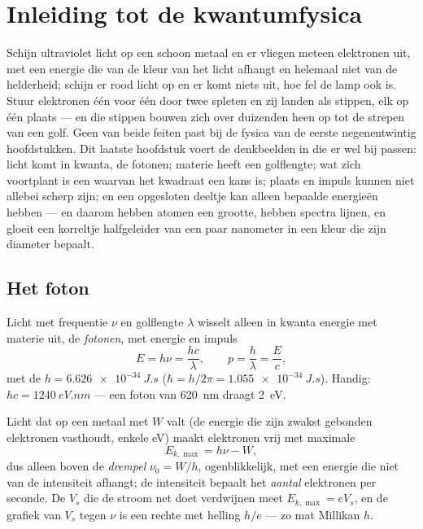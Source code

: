 \chapter{Inleiding tot de kwantumfysica}\label{ch:b1:quantum-introduction}

Schijn ultraviolet licht op een schoon metaal en er vliegen meteen elektronen
uit, met een energie die van de kleur van het licht afhangt en helemaal niet
van de helderheid; schijn er rood licht op en er komt niets uit, hoe fel
de lamp ook is. Stuur elektronen één voor één door twee spleten en zij
landen als stippen, elk op één plaats --- en die stippen bouwen zich over
duizenden heen op tot de strepen van een golf. Geen van beide feiten past bij de
fysica van de eerste negenentwintig hoofdstukken. Dit laatste hoofdstuk voert de
denkbeelden in die er wel bij passen: licht komt in kwanta, de fotonen; materie
heeft een golflengte; wat zich voortplant is een  waarvan het kwadraat
een kans is; plaats en impuls kunnen niet allebei scherp zijn; en een
opgesloten deeltje kan alleen bepaalde energieën hebben --- en daarom hebben
atomen een grootte, hebben spectra lijnen, en gloeit een korreltje halfgeleider
van een paar nanometer in een kleur die zijn diameter bepaalt.

\section{Het foton}

\begin{theorem}\label{thm:b1:quantum-introduction:photon}
Licht met frequentie $\nu$ en golflengte $\lambda$ wisselt alleen in kwanta
energie met materie uit, de \emph{fotonen}, met energie en impuls
\[
E = h\nu = \frac{hc}{\lambda} , \qquad p = \frac{h}{\lambda} = \frac{E}{c} ,
\]
met de \emph{} $h = \qty{6.626e-34}{J.s}$ ($\hbar = h/2\pi =
\qty{1.055e-34}{J.s}$). Handig: $hc = \qty{1240}{eV.nm}$ --- een foton van
\qty{620}{nm} draagt \qty{2}{eV}.
\end{theorem}
\admitted

\begin{proposition}\label{prop:b1:quantum-introduction:photoelectric}
Licht dat op een metaal met \emph{} $W$ valt (de energie die
zijn zwakst gebonden elektronen vasthoudt, enkele eV) maakt elektronen vrij met
maximale 
\[
E_{k,\max} = h\nu - W ,
\]
dus alleen boven de \emph{drempel} $\nu_0 = W/h$, ogenblikkelijk, met een
energie die niet van de intensiteit afhangt; de intensiteit bepaalt het
\emph{aantal} elektronen per seconde. De \emph{}
$V_s$ die de stroom net doet verdwijnen meet $E_{k,\max} = eV_s$, en
de grafiek van $V_s$ tegen $\nu$ is een rechte met helling $h/e$ --- zo
mat Millikan $h$.
\end{proposition}

